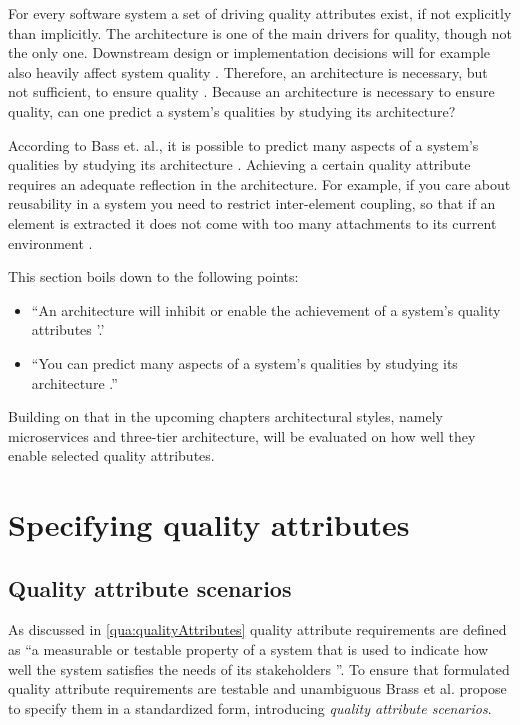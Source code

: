 For every software system a set of driving quality attributes exist, if not explicitly than implicitly.
The architecture is one of the main drivers for quality, though not the only one.
Downstream design or implementation decisions will for example also heavily affect system quality \citep[p. 25]{Bass2012}.
Therefore, an architecture is necessary, but not sufficient, to ensure quality \citep[p. 26]{Bass2012}.
Because an architecture is necessary to ensure quality, can one predict a system's qualities by studying its architecture?

According to Bass et. al., it is possible to predict many aspects of a system's qualities by studying its architecture \citep[p. 40]{Bass2012}.
Achieving a certain quality attribute requires an adequate reflection in the architecture.
For example, if you care about reusability in a system you need to restrict inter-element coupling, so that if an element is extracted it does not come with too many attachments to its current environment \citep[p. 26]{Bass2012}.

This section boils down to the following points:
\begin{itemize}
\item ``An architecture will inhibit or enable the achievement of a system's quality attributes \citep[p. 40]{Bass2012}'.'
\item ``You can predict many aspects of a system's qualities by studying its architecture \citep[p. 40]{Bass2012}.''
\end{itemize}
Building on that in the upcoming chapters architectural styles, namely microservices and three-tier architecture, will be evaluated on how well they enable selected quality attributes.

\section{Specifying quality attributes}
\label{qua:qualityScenarios}
\subsection{Quality attribute scenarios}
As discussed in \ref{qua:qualityAttributes} quality attribute requirements are defined as ``a measurable or testable property of a system that is used to indicate how well the system satisfies the needs of its stakeholders \citep[p. 63]{Bass2012}''.
To ensure that formulated quality attribute requirements are testable and unambiguous Brass et al. propose to specify them in a standardized form, introducing \textit{quality attribute scenarios}.

